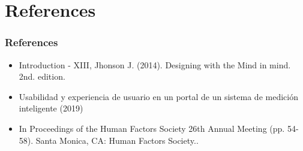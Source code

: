 \documentclass[11pt]{beamer}
\begin{document}
    \section{References}
    \begin{frame}
    \frametitle{References}
    \begin{itemize}
    \item Introduction - XIII, Jhonson J. (2014). Designing with the Mind in mind. 2nd. edition.
    \item Usabilidad y experiencia de usuario en un portal de un sistema de medición inteligente (2019)
    \item In Proceedings of the Human Factors Society 26th Annual Meeting (pp. 54-58). Santa Monica, CA: Human Factors Society..
    \end{itemize}
    \end{frame}
\end{document}
